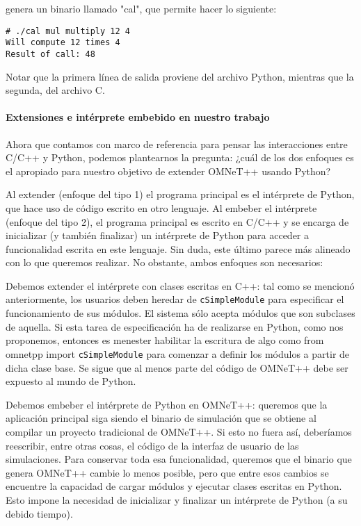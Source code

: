 \documentclass[]{article}
\begin{document}
genera un binario llamado "cal", que permite hacer lo siguiente:

\begin{verbatim}
# ./cal mul multiply 12 4
Will compute 12 times 4
Result of call: 48
\end{verbatim}

Notar que la primera línea de salida proviene del archivo Python, mientras que
la segunda, del archivo C.

\paragraph{Extensiones e intérprete embebido en nuestro trabajo}

Ahora que contamos con marco de referencia para pensar las interacciones entre
C/C++ y Python, podemos plantearnos la pregunta: ¿cuál de los dos enfoques es
el apropiado para nuestro objetivo de extender OMNeT++ usando Python?

Al extender (enfoque del tipo 1) el programa principal es el intérprete de
Python, que hace uso de código escrito en otro lenguaje. Al embeber el
intérprete (enfoque del tipo 2), el programa principal es escrito en C/C++ y se
encarga de inicializar (y también finalizar) un intérprete de Python para
acceder a funcionalidad escrita en este lenguaje. Sin duda, este último parece
más alineado con lo que queremos realizar. No obstante, ambos enfoques son
necesarios:

Debemos extender el intérprete con clases escritas en C++: tal como se mencionó
anteriormente, los usuarios deben heredar de \verb!cSimpleModule! para
especificar el funcionamiento de sus módulos. El sistema sólo acepta módulos
que son subclases de aquella. Si esta tarea de especificación ha de realizarse
en Python, como nos proponemos, entonces es menester habilitar la escritura de
algo como from omnetpp import \verb!cSimpleModule! para comenzar a definir los
módulos a partir de dicha clase base. Se sigue que al menos parte del código de
OMNeT++ debe ser expuesto al mundo de Python.

Debemos embeber el intérprete de Python en OMNeT++: queremos que la aplicación
principal siga siendo el binario de simulación que se obtiene al compilar un
proyecto tradicional de OMNeT++. Si esto no fuera así, deberíamos reescribir,
entre otras cosas, el código de la interfaz de usuario de las simulaciones.
Para conservar toda esa funcionalidad, queremos que el binario que genera
OMNeT++ cambie lo menos posible, pero que entre esos cambios se encuentre la
capacidad de cargar módulos y ejecutar clases escritas en Python. Esto impone
la necesidad de inicializar y finalizar un intérprete de Python (a su debido
tiempo).
\end{document}

